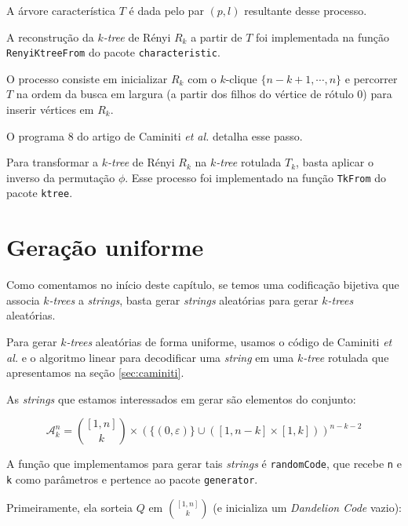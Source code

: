 \begin{algorithm}
\begin{step}
    A árvore característica $T$ é dada pelo par $(p, l)$ resultante desse processo.
  \end{step}

  \begin{step}
    A reconstrução da \emph{$k$-tree} de Rényi $R_k$ a partir de $T$ foi implementada na função {\tt RenyiKtreeFrom} do pacote {\tt characteristic}.

    O processo consiste em inicializar $R_k$ com o $k$-clique $\{ n-k+1, \cdots, n \}$ e percorrer $T$ na ordem da busca em largura (a partir dos filhos do vértice de rótulo $0$) para inserir vértices em $R_k$.

    O programa 8 do artigo de Caminiti \emph{et al.} \cite{caminiti} detalha esse passo.
  \end{step}

  \begin{step}
    Para transformar a \emph{$k$-tree} de Rényi $R_k$ na \emph{$k$-tree} rotulada $T_k$, basta aplicar o inverso da permutação $\phi$. Esse processo foi implementado na função {\tt TkFrom} do pacote {\tt ktree}.
  \end{step}
\end{algorithm}

\section{Geração uniforme}
\label{sec:geracao}

Como comentamos no início deste capítulo, se temos uma codificação bijetiva que associa \emph{$k$-trees} a \emph{strings}, basta gerar \emph{strings} aleatórias para gerar \emph{$k$-trees} aleatórias.

Para gerar \emph{$k$-trees} aleatórias de forma uniforme, usamos o código de Caminiti \emph{et al.} \cite{caminiti} e o algoritmo linear para decodificar uma \emph{string} em uma \emph{$k$-tree} rotulada que apresentamos na seção \ref{sec:caminiti}.

As \emph{strings} que estamos interessados em gerar são elementos do conjunto:

$$
\mathcal{A}^n_k = { [1,n] \choose k } \times (\{ ( 0, \varepsilon ) \} \cup ([1,n-k] \times [1,k]))^{n-k-2}
$$

A função que implementamos para gerar tais \emph{strings} é {\tt randomCode}, que recebe {\tt n} e {\tt k} como parâmetros e pertence ao pacote {\tt generator}.

Primeiramente, ela sorteia $Q$ em ${ [1,n] \choose k }$ (e inicializa um \emph{Dandelion Code} vazio):


